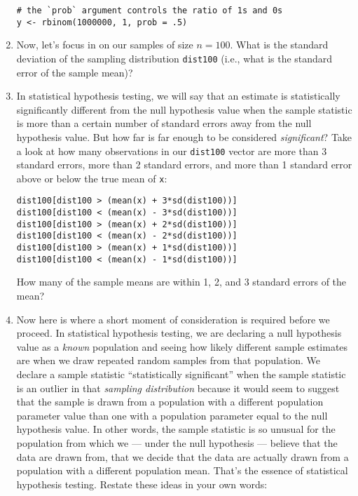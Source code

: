 \documentclass[a4paper,12pt]{article}
\begin{document}
\begin{enumerate}
\begin{verbatim}
# the `prob` argument controls the ratio of 1s and 0s
y <- rbinom(1000000, 1, prob = .5) 
\end{verbatim}

\item Now, let's focus in on our samples of size $n=100$. What is the standard deviation of the sampling distribution \texttt{dist100} (i.e., what is the standard error of the sample mean)?

\item In statistical hypothesis testing, we will say that an estimate is statistically significantly different from the null hypothesis value when the sample statistic is more than a certain number of standard errors away from the null hypothesis value. But how far is far enough to be considered \textit{significant}? Take a look at how many observations in our \texttt{dist100} vector are more than 3 standard errors, more than 2 standard errors, and more than 1 standard error above or below the true mean of \texttt{x}:

\begin{verbatim}
dist100[dist100 > (mean(x) + 3*sd(dist100))]
dist100[dist100 < (mean(x) - 3*sd(dist100))]
dist100[dist100 > (mean(x) + 2*sd(dist100))]
dist100[dist100 < (mean(x) - 2*sd(dist100))]
dist100[dist100 > (mean(x) + 1*sd(dist100))]
dist100[dist100 < (mean(x) - 1*sd(dist100))]
\end{verbatim}

\noindent How many of the sample means are within 1, 2, and 3 standard errors of the mean? 

\vspace{4em}

\item Now here is where a short moment of consideration is required before we proceed. In statistical hypothesis testing, we are declaring a null hypothesis value as a \textit{known} population and seeing how likely different sample estimates are when we draw repeated random samples from that population. We declare a sample statistic ``statistically significant'' when the sample statistic is an outlier in that \textit{sampling distribution} because it would seem to suggest that the sample is drawn from a population with a different population parameter value than one with a population parameter equal to the null hypothesis value. In other words, the sample statistic is so unusual for the population from which we --- under the null hypothesis --- believe that the data are drawn from, that we decide that the data are actually drawn from a population with a different population mean. That's the essence of statistical hypothesis testing. Restate these ideas in your own words:


\end{enumerate}
\end{document}
